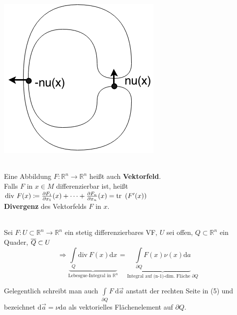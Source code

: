 \includegraphics[scale=0.3]{pictures/007-03}

\begin{definition}
    \mbox{} \\
    Eine Abbildung $F: \mathbb{R}^n \rightarrow \mathbb{R}^n $ heißt auch
    \textbf{Vektorfeld}.\\
    Falls $F$ in $x \in M $ differenzierbar ist, heißt \\
    $\mathrm{div\ }F(x) \coloneqq \frac{\partial{F_1}}{\partial{x_1}}(x) + \cdots + \frac{\partial{F_n}}{\partial{x_n}}(x) =
    \mathrm{tr\ }\left(F'(x)\right) $\\
    \textbf{Divergenz} des Vektorfelds $F$ in $x$.
\end{definition}

\begin{satz}
\mbox{} \\
Sei $F: U \subset \mathbb{R}^n \rightarrow \mathbb{R}^n $ ein stetig differenzierbares VF,
$U$ sei offen, $Q \subset \mathbb{R}^n $ ein Quader, $\overline{Q} \subset U \\
$
\begin{equation}
    \Longrightarrow 
    \underbrace
        {\int\limits_Q \mathrm{div\ } F(x) \mathrm{d}x
    }_{
        \text{Lebesgue-Integral in }\mathbb{R}^n}
    =
    \underbrace{
        \int\limits_{\partial Q} F(x) \nu(x) \mathrm{d}a
    }_{
        \text{Integral auf (n-1)-dim. Fläche } \partial Q
    }    
\end{equation}

\end{satz}

Gelegentlich schreibt man auch $\int\limits_{\partial Q} F \ \mathrm{d}\vec{a} $ anstatt
der rechten Seite in (5) und bezeichnet
$\mathrm{d}\vec{a} = \nu \mathrm{d}a $ als vektorielles Flächenelement auf
$\partial Q $.


